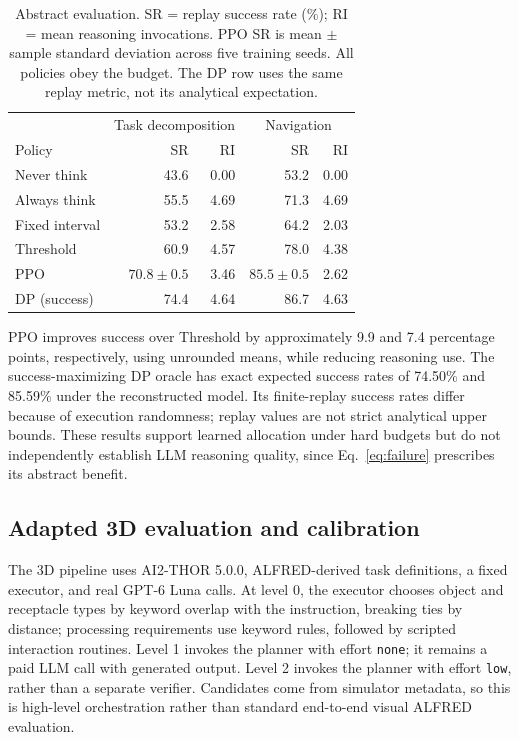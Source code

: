 \documentclass[conference]{IEEEtran}
\begin{document}
\begin{table}[t]
\centering
\caption{Abstract evaluation. SR = replay success rate (\%); RI = mean reasoning invocations. PPO SR is mean $\pm$ sample standard deviation across five training seeds. All policies obey the budget. The DP row uses the same replay metric, not its analytical expectation.}
\label{tab:abstract}
\small
\begin{tabular}{@{}lrrrr@{}}
\toprule
&\multicolumn{2}{c}{Task decomposition}&\multicolumn{2}{c}{Navigation}\\
Policy&SR&RI&SR&RI\\
\midrule
Never think&43.6&0.00&53.2&0.00\\
Always think&55.5&4.69&71.3&4.69\\
Fixed interval&53.2&2.58&64.2&2.03\\
Threshold&60.9&4.57&78.0&4.38\\
PPO&$70.8\!\pm\!0.5$&3.46&$85.5\!\pm\!0.5$&2.62\\
DP (success)&74.4&4.64&86.7&4.63\\
\bottomrule
\end{tabular}
\end{table}

PPO improves success over Threshold by approximately 9.9 and 7.4 percentage points, respectively, using unrounded means, while reducing reasoning use. The success-maximizing DP oracle has exact expected success rates of 74.50\% and 85.59\% under the reconstructed model. Its finite-replay success rates differ because of execution randomness; replay values are not strict analytical upper bounds. These results support learned allocation under hard budgets but do not independently establish LLM reasoning quality, since Eq.~\eqref{eq:failure} prescribes its abstract benefit.

\subsection{Adapted 3D evaluation and calibration}
The 3D pipeline uses AI2-THOR 5.0.0, ALFRED-derived task definitions, a fixed executor, and real GPT-6 Luna calls. At level 0, the executor chooses object and receptacle types by keyword overlap with the instruction, breaking ties by distance; processing requirements use keyword rules, followed by scripted interaction routines. Level 1 invokes the planner with effort \texttt{none}; it remains a paid LLM call with generated output. Level 2 invokes the planner with effort \texttt{low}, rather than a separate verifier. Candidates come from simulator metadata, so this is high-level orchestration rather than standard end-to-end visual ALFRED evaluation.
\end{document}
